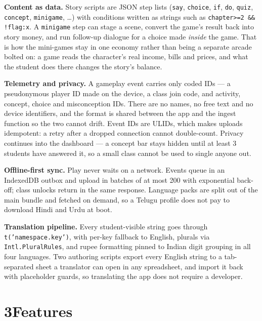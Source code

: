 \documentclass[10pt,a4paper]{article}
\begin{document}
\textbf{Content as data.} Story scripts are JSON step lists (\texttt{say}, \texttt{choice}, \texttt{if}, \texttt{do}, \texttt{quiz}, \texttt{concept}, \texttt{minigame}, \ldots) with conditions written as strings such as \texttt{chapter>=2 \&\& !flag:x}. A \texttt{minigame} step can stage a scene, convert the game's result back into story money, and run follow-up dialogue for a choice made \emph{inside} the game. That is how the mini-games stay in one economy rather than being a separate arcade bolted on: a game reads the character's real income, bills and prices, and what the student does there changes the story's balance.

\textbf{Telemetry and privacy.} A gameplay event carries only coded IDs --- a pseudonymous player ID made on the device, a class join code, and activity, concept, choice and misconception IDs. There are no names, no free text and no device identifiers, and the format is shared between the app and the ingest function so the two cannot drift. Event IDs are ULIDs, which makes uploads idempotent: a retry after a dropped connection cannot double-count. Privacy continues into the dashboard --- a concept bar stays hidden until at least 3 students have answered it, so a small class cannot be used to single anyone out.

\textbf{Offline-first sync.} Play never waits on a network. Events queue in an IndexedDB outbox and upload in batches of at most 200 with exponential back-off; class unlocks return in the same response. Language packs are split out of the main bundle and fetched on demand, so a Telugu profile does not pay to download Hindi and Urdu at boot.

\textbf{Translation pipeline.} Every student-visible string goes through \texttt{t('namespace.key')}, with per-key fallback to English, plurals via \texttt{Intl.PluralRules}, and rupee formatting pinned to Indian digit grouping in all four languages. Two authoring scripts export every English string to a tab-separated sheet a translator can open in any spreadsheet, and import it back with placeholder guards, so translating the app does not require a developer.

\section*{3\quad Features}
\end{document}
